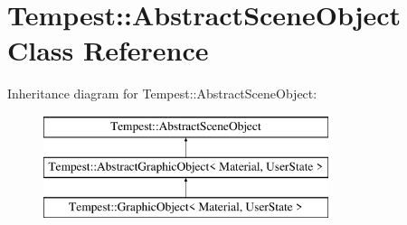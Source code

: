 \hypertarget{class_tempest_1_1_abstract_scene_object}{\section{Tempest\+:\+:Abstract\+Scene\+Object Class Reference}
\label{class_tempest_1_1_abstract_scene_object}
}
Inheritance diagram for Tempest\+:\+:Abstract\+Scene\+Object\+:\begin{figure}[H]
\begin{center}
\leavevmode
\includegraphics[height=3.000000cm]{class_tempest_1_1_abstract_scene_object}
\end{center}
\end{figure}
